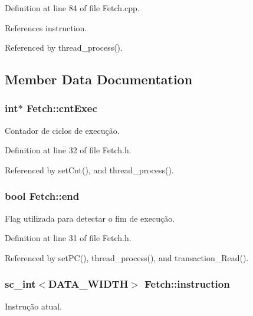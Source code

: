 Definition at line 84 of file Fetch.\+cpp.



References instruction.



Referenced by thread\+\_\+process().



\subsection{Member Data Documentation}
\hypertarget{classFetch_a9598888b1bb54bf4946efe56639279d8}{
\subsubsection[{cnt\+Exec}]{\setlength{\rightskip}{0pt plus 5cm}int$\ast$ Fetch\+::cnt\+Exec\hspace{0.3cm}{\ttfamily [private]}}}\label{classFetch_a9598888b1bb54bf4946efe56639279d8}
Contador de ciclos de execução. 

Definition at line 32 of file Fetch.\+h.



Referenced by set\+Cnt(), and thread\+\_\+process().

\hypertarget{classFetch_ae42d76542792425cdd2b896b4558cb8b}{
\subsubsection[{end}]{\setlength{\rightskip}{0pt plus 5cm}bool Fetch\+::end\hspace{0.3cm}{\ttfamily [private]}}}\label{classFetch_ae42d76542792425cdd2b896b4558cb8b}
Flag utilizada para detectar o fim de execução. 

Definition at line 31 of file Fetch.\+h.



Referenced by set\+P\+C(), thread\+\_\+process(), and transaction\+\_\+\+Read().

\hypertarget{classFetch_ab7c97d2c0dab91563c0f33ba6c6a4cb0}{
\subsubsection[{instruction}]{\setlength{\rightskip}{0pt plus 5cm}sc\+\_\+int$<${\bf D\+A\+T\+A\+\_\+\+W\+I\+D\+T\+H}$>$ Fetch\+::instruction\hspace{0.3cm}{\ttfamily [private]}}}\label{classFetch_ab7c97d2c0dab91563c0f33ba6c6a4cb0}
Instrução atual. 


